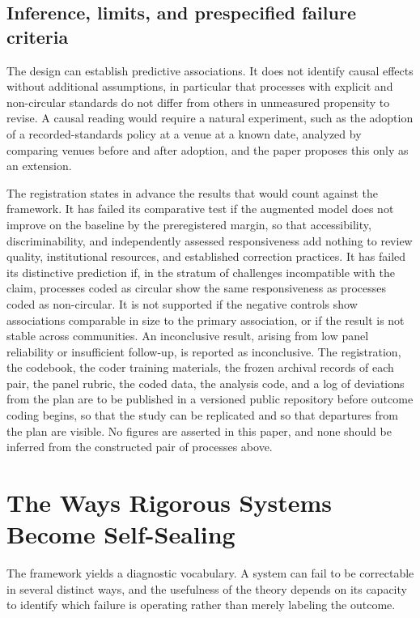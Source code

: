 \documentclass[11pt]{article}
\theoremstyle{remark}
\begin{document}
\subsection{Inference, limits, and prespecified failure criteria}

The design can establish predictive associations. It does not identify causal effects without additional assumptions, in particular that processes with explicit and non-circular standards do not differ from others in unmeasured propensity to revise. A causal reading would require a natural experiment, such as the adoption of a recorded-standards policy at a venue at a known date, analyzed by comparing venues before and after adoption, and the paper proposes this only as an extension.

The registration states in advance the results that would count against the framework. It has failed its comparative test if the augmented model does not improve on the baseline by the preregistered margin, so that accessibility, discriminability, and independently assessed responsiveness add nothing to review quality, institutional resources, and established correction practices. It has failed its distinctive prediction if, in the stratum of challenges incompatible with the claim, processes coded as circular show the same responsiveness as processes coded as non-circular. It is not supported if the negative controls show associations comparable in size to the primary association, or if the result is not stable across communities. An inconclusive result, arising from low panel reliability or insufficient follow-up, is reported as inconclusive. The registration, the codebook, the coder training materials, the frozen archival records of each pair, the panel rubric, the coded data, the analysis code, and a log of deviations from the plan are to be published in a versioned public repository before outcome coding begins, so that the study can be replicated and so that departures from the plan are visible. No figures are asserted in this paper, and none should be inferred from the constructed pair of processes above.

\section{The Ways Rigorous Systems Become Self-Sealing}

The framework yields a diagnostic vocabulary. A system can fail to be correctable in several distinct ways, and the usefulness of the theory depends on its capacity to identify which failure is operating rather than merely labeling the outcome.
\end{document}
